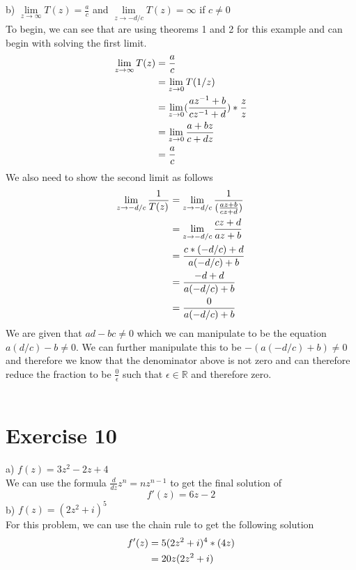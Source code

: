 \documentclass[notitlepage]{article}
\begin{document}
    b) $\lim\limits_{z \to \infty}T(z) =\frac{a}{c}$ and 
    $\lim\limits_{z \to -d/c}T(z) = \infty$ if $c\neq 0$  \\
    To begin, we can see that are using theorems 1 and 2 for this example and can begin with solving
    the first limit.
\begin{equation}
    \begin{split}
        \notag
         \lim\limits_{z \to \infty}T(z) &= \frac{a}{c} \\
                 &= \lim\limits_{z \to 0}T(1/z)\\
                 &=   \lim\limits_{z \to 0}(\frac{az^{-1}+b}{cz^{-1}+d})  * \frac{z}{z}\\
                 &= \lim\limits_{z \to 0}\frac{a+bz}{c+dz} \\
                 &= \frac{a}{c}
    \end{split}
\end{equation}
    We also need to show the second limit as follows
\begin{equation}
    \begin{split}
        \notag
        \lim\limits_{z \to -d/c}\frac{1}{T(z)} &= \lim\limits_{z \to -d/c}\frac{1}{(\frac{az+b}{cz+d})} \\
         &= \lim\limits_{z \to -d/c}\frac{cz+d}{az+b} \\
          &= \frac{c*(-d/c)+d}{a(-d/c)+b} \\
          &= \frac{-d+d}{a(-d/c)+b} \\
          &= \frac{0}{a(-d/c)+b}
  \end{split}
\end{equation}
    We are given that $ad-bc \neq 0$ which we can manipulate to be the equation 
    $a(d/c) - b \neq 0$. We can further manipulate this to be $-(a(-d/c)+b) \neq 0$ and therefore
    we know that the denominator above is not zero and can therefore reduce the fraction to be 
    $\frac{0}{\epsilon}$ such that $\epsilon \in \mathbb{R}$ and therefore zero. \\~\\

\section*{Exercise 10}

    a) $f(z) = 3z^2-2z+4$ \\
        We can use the formula $\frac{d}{dz}z^n = nz^{n-1}$ to get the final solution of
        $$f'(z) = 6z - 2$$
    b) $f(z) = (2z^2+i)^5$ \\
            For this problem, we can use the chain rule to get the following solution
\begin{equation}
    \begin{split}
        \notag
        f'(z) &= 5(2z^2+i)^4*(4z) \\
                &= 20z(2z^2+i)
    \end{split}
\end{equation}
\end{document}

